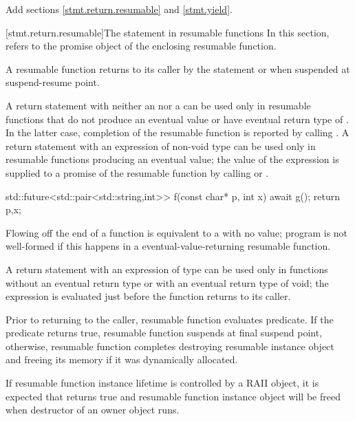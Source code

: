 Add sections \ref{stmt.return.resumable} and \ref{stmt.yield}.

[stmt.return.resumable]{The  statement in resumable functions}%
\enternote
In this section,  refers to the promise object
of the enclosing resumable function.
\exitnote

\pnum
A resumable function returns to its caller by the  statement
or when suspended at suspend-resume point.

\pnum
A return statement
with neither an  nor a 
can be used only in resumable functions
that do not produce an eventual value or have eventual return type of . In the latter case, completion of the resumable function
is reported by calling .
A return statement with an expression of non-void type can be used only
in resumable functions producing an eventual value; the value of the expression is supplied to a promise of the resumable function by calling 
 or
.

\enterexample

\begin{codeblock}
	std::future<std::pair<std::string,int>> f(const char* p, int x) {
		await g();
		return {p,x};
	}
\end{codeblock}
\exitexample

Flowing off the end of a function is equivalent to a  with
no value; program is not well-formed if this happens in a eventual-value-returning resumable function.

\pnum
A return statement with an expression of type 
can be used only in functions without an eventual return type 
or with an eventual return type of void; the expression is evaluated just before the function
returns to its caller.

\pnum
Prior to returning to the caller, resumable function evaluates
 predicate. If the predicate returns
true, resumable function suspends at final suspend point,
otherwise, resumable function completes destroying resumable instance
object and freeing its memory if it was dynamically allocated.

\enternote
If resumable function instance lifetime is controlled 
by a RAII object, it is expected that  returns true
and resumable function instance object will be freed when
destructor of an owner object runs.

